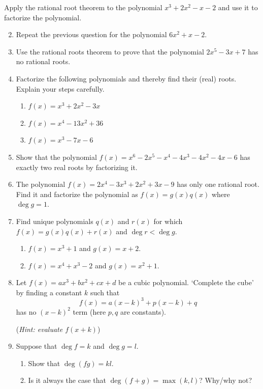 \begin{exercises}{}{}
	\exstart Apply the rational root theorem to the polynomial $x^3+2x^2-x-2$ and use it to factorize the polynomial.
	\begin{enumerate}\setcounter{enumi}{1}
	  \item Repeat the previous question for the polynomial $6x^2+x-2$.
	
		\item Use the rational roots theorem to prove that the polynomial $2x^5-3x+7$ has no rational roots.
	  
	  \item Factorize the following polynomials and thereby find their (real) roots. Explain your steps carefully.
	  \begin{enumerate}
	    \item $f(x)=x^3+2x^2-3x$ %
	    \item $f(x)=x^4-13x^2+36$ %
	    \item $f(x)=x^3-7x-6$ %
	  \end{enumerate}
	  
	  
	  \item Show that the polynomial $f(x)=x^6-2x^5-x^4-4x^3-4x^2-4x-6$ %
	  has exactly two real roots by factorizing it.
		
		\item The polynomial $f(x)=2x^4-3x^3+2x^2+3x-9$ has only one rational root. Find it and factorize the polynomial as $f(x)=g(x)q(x)$ where $\deg g=1$.
		
		
		\item Find unique polynomials $q(x)$ and $r(x)$ for which $f(x)=g(x)q(x)+r(x)$ and $\deg r<\deg g$.
		\begin{enumerate}
		  \item $f(x)=x^3+1$ and $g(x)=x+2$.
		  \item	$f(x)=x^4+x^3-2$ and $g(x)=x^2+1$.
		\end{enumerate}  
	
	  \item Let $f(x)=ax^3+bx^2+cx+d$ be a cubic polynomial. `Complete the cube' by finding a constant $k$ such that
	  \[
	  	f(x)=a(x-k)^3+p(x-k)+q
	  \]
	  has no $(x-k)^2$ term (here $p,q$ are constants).\par
	  (\emph{Hint: evaluate $f(x+k)$})
	  
	  \item Suppose that $\deg f=k$ and $\deg g=l$.
	  \begin{enumerate}
	    \item Show that $\deg(fg)=kl$.
	    \item Is it always the case that $\deg(f+g)=\max(k,l)$? Why/why not?
	  \end{enumerate}
	\end{enumerate}
\end{exercises}

